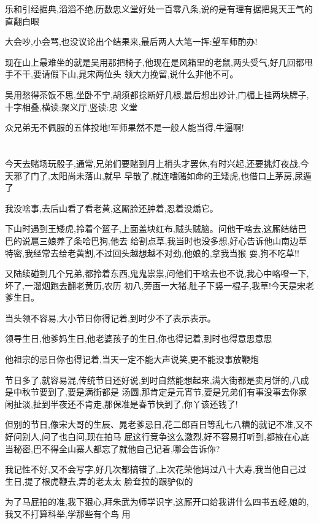 ﻿\documentclass[12pt]{article}
\begin{document}
乐和引经据典,滔滔不绝,历数忠义堂好处一百零八条,说的是有理有据\dldots 把晁天王气的直翻白眼

大会吵,小会骂,也没议论出个结果来,最后两人大笔一挥:望军师酌办!

现在山上最难坐的就是吴用那把椅子,他现在是风箱里的老鼠,两头受气,好几回都甩手不干,要请假下山,晁宋两位头
领大力挽留,说什么非他不可。

吴用愁得茶饭不思,坐卧不宁,胡须都捻断好几根,最后想出妙计,门楣上挂两块牌子,十字相叠,横读:聚义厅,竖读:忠
义堂

众兄弟无不佩服的五体投地!军师果然不是一般人能当得,牛逼啊!
\section{}

今天去赌场玩骰子,通常,兄弟们要赌到月上梢头才罢休,有时兴起,还要挑灯夜战,今天邪了门了,太阳尚未落山,就早
早散了,就连嗜赌如命的王矮虎,也借口上茅房,尿遁了

我没啥事,去后山看了看老黄,这厮脸还肿着,忍着没煽它。

下山时遇到王矮虎,拎着个篮子,上面盖块红布,贼头贼脑。问他干啥去,这厮结结巴巴的说扈三娘养了条哈巴狗,他去
给割点草,我当时也没多想,好心告诉他山南边草特密,我经常去给老黄割,不过回头越想越不对劲,他娘的,拿我当猴
耍,狗不吃草!!

又陆续碰到几个兄弟,都拎着东西,鬼鬼祟祟,问他们干啥去也不说,我心中咯噔一下,坏了,一溜烟跑去翻老黄历,农历
初八,旁画一大猪,肚子下竖一棍子,我草!今天是宋老爹生日。

当头领不容易,大小节日你得记着,到时少不了表示表示。

领导生日,他爹妈生日,他老婆孩子的生日,你也得记着,到时也得意思意思

他祖宗的忌日你也得记着,当天一定不能大声说笑,更不能没事放鞭炮\dldots

节日多了,就容易混,传统节日还好说,到时自然能想起来,满大街都是卖月饼的,八成是中秋节要到了,要是满街都是
汤圆,那肯定是元宵节,要是兄弟们有事没事去你家闲扯淡,扯到半夜还不肯走,那保准是春节快到了,你丫该还钱了!

但别的节日,像宋大哥的生辰、晁老爹忌日,花二郎百日等乱七八糟的就记不准,又不好问别人,问了也白问,现在拍马
屁这行竞争这么激烈,好不容易打听到,都掖在心底当秘密,巴不得全山寨人都忘了就他自己记着,哪会告诉你?

我记性不好,又不会写字,好几次都搞错了,上次花荣他妈过八十大寿,我当他自己过生日,提了根虎鞭去,弄的老太太
脸耷拉的跟驴似的

为了马屁拍的准,我下狠心,拜朱武为师学识字,这厮开口给我讲什么四书五经,娘的,我又不打算科举,学那些有个鸟
用
\end{document}
